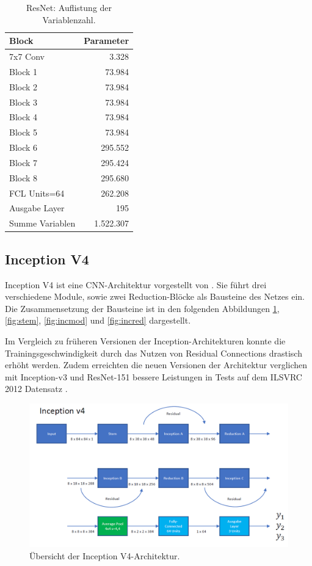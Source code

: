 \begin{table}
\centering
\caption{ResNet: Auflistung der Variablenzahl.}
\begin{tabular}{@{}lr@{}}
\hline
Block & Parameter\\
\hline
7x7 Conv &  3.328\\
Block 1 & 73.984\\
Block 2 & 73.984\\
Block 3 & 73.984\\
Block 4 & 73.984\\
Block 5 & 73.984\\
Block 6 & 295.552\\
Block 7 & 295.424\\
Block 8 & 295.680\\
FCL Units=64 & 262.208\\
Ausgabe Layer & 195\\
\hline
Summe Variablen & 1.522.307\\
\hline
\end{tabular}
\label{tb:resnet}
\end{table}

\subsection{Inception V4}
\label{sek:incv4}
Inception V4 ist eine CNN-Architektur vorgestellt von \textcite{DBLP:journals/corr/SzegedyIV16}. Sie f\"uhrt drei verschiedene Module, sowie zwei Reduction-Bl\"ocke als Bausteine des Netzes ein. Die Zusammensetzung der Bausteine ist in den folgenden Abbildungen \ref{fig:incv4}, \ref{fig:stem}, \ref{fig:incmod} und \ref{fig:incred} dargestellt.

Im Vergleich zu früheren Versionen der Inception-Architekturen konnte die Trainingsgeschwindigkeit durch das Nutzen von Residual Connections drastisch erhöht werden. Zudem erreichten die neuen Versionen der Architektur verglichen mit Inception-v3 und ResNet-151 bessere Leistungen in Tests auf dem ILSVRC 2012 Datensatz \parencite{DBLP:journals/corr/SzegedyIV16}.
\newpage
\begin{figure}[H]
\centering
\thispagestyle{empty}
\includegraphics[angle=90, scale=0.8]{pictures/inception/InceptionV4}
\caption[Caption for LOF]{Übersicht der Inception V4-Architektur.}
\label{fig:incv4}
\end{figure}

